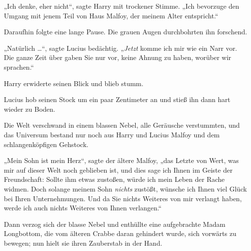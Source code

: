 „Ich denke, eher nicht“, sagte Harry mit trockener Stimme.
„Ich bevorzuge den Umgang mit jenem Teil von Haus Malfoy, der meinem Alter entspricht.“

Daraufhin folgte eine lange Pause. Die grauen Augen durchbohrten ihn forschend.

„Natürlich …“, sagte Lucius bedächtig.
„\emph{Jetzt} komme ich mir wie ein Narr vor. Die ganze Zeit über gaben Sie nur vor, keine Ahnung zu haben, worüber wir sprachen.“

Harry erwiderte seinen Blick und blieb stumm.

Lucius hob seinen Stock um ein paar Zentimeter an und stieß ihn dann hart wieder zu Boden.

Die Welt verschwand in einem blassen Nebel, alle Geräusche verstummten, und das Universum bestand nur noch aus Harry und Lucius Malfoy und dem schlangenköpfigen Gehstock.

„Mein Sohn ist mein Herz“, sagte der ältere Malfoy, „das Letzte von Wert, was mir auf dieser Welt noch geblieben ist, und dies sage ich Ihnen im Geiste der Freundschaft: Sollte ihm etwas zustoßen, würde ich mein Leben der Rache widmen. Doch solange meinem Sohn \emph{nichts} zustößt, wünsche ich Ihnen viel Glück bei Ihren Unternehmungen. Und da Sie nichts Weiteres von mir verlangt haben, werde ich auch nichts Weiteres von Ihnen verlangen.“

Dann verzog sich der blasse Nebel und enthüllte eine aufgebrachte Madam Longbottom, die vom älteren Crabbe daran gehindert wurde, sich vorwärts zu bewegen; nun hielt sie ihren Zauberstab in der Hand.

